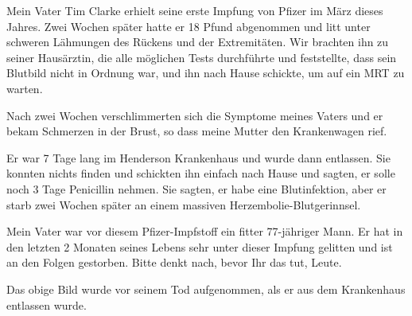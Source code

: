 Mein Vater Tim Clarke erhielt seine erste Impfung von Pfizer im März dieses
Jahres. Zwei Wochen später hatte er 18 Pfund abgenommen und litt unter schweren
Lähmungen des Rückens und der Extremitäten. Wir brachten ihn zu seiner
Hausärztin, die alle möglichen Tests durchführte und feststellte, dass sein
Blutbild nicht in Ordnung war, und ihn nach Hause schickte, um auf ein MRT zu
warten.

Nach zwei Wochen verschlimmerten sich die Symptome meines Vaters und er bekam
Schmerzen in der Brust, so dass meine Mutter den Krankenwagen rief.

Er war 7 Tage lang im Henderson Krankenhaus und wurde dann entlassen. Sie
konnten nichts finden und schickten ihn einfach nach Hause und sagten, er solle
noch 3 Tage Penicillin nehmen. Sie sagten, er habe eine Blutinfektion, aber er
starb zwei Wochen später an einem massiven Herzembolie-Blutgerinnsel.

Mein Vater war vor diesem Pfizer-Impfstoff ein fitter 77-jähriger Mann. Er hat
in den letzten 2 Monaten seines Lebens sehr unter dieser Impfung gelitten und
ist an den Folgen gestorben. Bitte denkt nach, bevor Ihr das tut, Leute.

Das obige Bild wurde vor seinem Tod aufgenommen, als er aus dem Krankenhaus
entlassen wurde.
